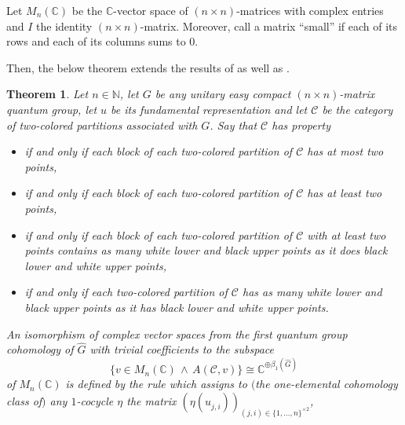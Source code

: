 \documentclass[10pt,a4paper]{amsart}
\numberwithin{equation}{section}
\newtheorem*{theorem*}{Theorem}
\newcommand{\identitymatrix}{I}
\newcommand{\Sand}{\,\wedge\,}
\newcommand{\pint}{\mathbb{N}}
\newcommand{\comps}{\mathbb{C}}
\newcommand{\Ssetmonoidalproduct}{\times}
\newcommand{\squarematrices}[2]{M_{#1}(#2)}
\newcommand{\CQGdualC}[1]{\widehat{#1}}
\newcommand{\thedim}{n}
\newcommand{\theqg}{G}
\newcommand{\theuni}{u}
\newcommand{\theunix}[3]{\theuni^{#1}_{#2,#3}}
\newcommand{\thecat}{\mathcal{C}}
\newcommand{\thepredicatex}[2]{A(#1,#2)}
\begin{document}
{
  \newcommand{\themat}{v}
  \newcommand{\indi}{i}
  \newcommand{\indj}{j}
  \newcommand{\thecoc}{\eta}
  \newcommand{\thecocx}[1]{\eta(#1)}
  \newcommand{\thebetti}{\beta_1(\widehat{G})}
  \newcommand{\thesum}{\lambda}
  \newcommand{\neutralblocks}{3}
  \newcommand{\neutralpartitions}{4}
  \newcommand{\smallblocks}{1}
  \newcommand{\largeblocks}{2}

  Let  $\squarematrices{\thedim}{\comps}$ be the $\comps$-vector space of $(\thedim\times\thedim)$-matrices with complex entries and $\identitymatrix$ the identity $(\thedim\times\thedim)$-matrix. Moreover, call a matrix  ``small'' if each of its rows and each of its columns sums to $0$.

Then, the below theorem extends the results  of  \cite{BichonFranzGerhold2017,DasFranzKulaSkalski2018} as well as \cite{Wendel2020}.
  \begin{theorem*}
Let $\thedim\in\pint$, let $\theqg$ be any unitary easy compact $(\thedim\times\thedim)$-matrix quantum group, let  $\theuni$ be its fundamental representation and let $\thecat$ be the category of two-co\-lo\-red partitions associated with $\theqg$. Say that $\thecat$ has property
  \begin{itemize}\itemsep=0pt
  \item[$(1)$] if and only if  each block of each two-co\-lo\-red partition of $\thecat$ has at most two points,
    \item[$(2)$] if and only if  each block of each two-co\-lo\-red partition of $\thecat$ has at least two points,
  \item[$(3)$] if and only if  each block of each two-co\-lo\-red partition of $\thecat$ with at least two points contains as many  white lower and black upper points as it does black lower and white upper points,
  \item[$(4)$]    if and only if each two-co\-lo\-red partition of $\thecat$ has as many white lower and black upper points as it has black lower and white upper points.
  \end{itemize}
An isomorphism of complex vector spaces from the first quantum group cohomology of $\CQGdualC{\theqg}$ with trivial coefficients to the subspace
  \[
 \{\themat\in\squarematrices{\thedim}{\comps}\Sand \thepredicatex{\thecat}{\themat}\}
\cong \mathbb{C}^{\oplus \beta_1(\widehat{G})}
  \]
  of $\squarematrices{\thedim}{\comps}$ is defined by the rule which assigns to $($the one-elemental cohomology class of$)$ any $1$-cocycle $\thecoc$ the matrix $ (\thecocx{\theunix{}{\indj}{\indi}} )_{(\indj,\indi)\in \{1,\ldots,\thedim\}^{\Ssetmonoidalproduct 2}}$,

\end{theorem*}}
\end{document}
